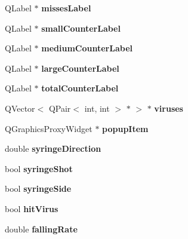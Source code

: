 \begin{DoxyCompactItemize}
\item 
\mbox{\label{classGameScene_aad6a61efba2e6f29f6fb65b8f7f7c609}} 
Q\+Label $\ast$ {\bfseries misses\+Label}
\item 
\mbox{\label{classGameScene_a729b30b1b93afceb74d91da40fe59089}} 
Q\+Label $\ast$ {\bfseries small\+Counter\+Label}
\item 
\mbox{\label{classGameScene_a13624da08c031f94ebd0fe64d312d7ff}} 
Q\+Label $\ast$ {\bfseries medium\+Counter\+Label}
\item 
\mbox{\label{classGameScene_a22d4e25913436a471671f6df7f2b31b0}} 
Q\+Label $\ast$ {\bfseries large\+Counter\+Label}
\item 
\mbox{\label{classGameScene_a11b39c8382f58ff70e211d1e266b9166}} 
Q\+Label $\ast$ {\bfseries total\+Counter\+Label}
\item 
\mbox{\label{classGameScene_aa6875246b95bb05f0a92c6c5fcd974e7}} 
Q\+Vector$<$ Q\+Pair$<$ int, int $>$ $\ast$ $>$ $\ast$ {\bfseries viruses}
\item 
\mbox{\label{classGameScene_a47243a49c11fc0f864bc89ecbb2266fd}} 
Q\+Graphics\+Proxy\+Widget $\ast$ {\bfseries popup\+Item}
\item 
\mbox{\label{classGameScene_af435d7691df3e0091cbcd4a642b5f401}} 
double {\bfseries syringe\+Direction}
\item 
\mbox{\label{classGameScene_aaaa4e9cfdf957c2e048fa8ebdafec7b8}} 
bool {\bfseries syringe\+Shot}
\item 
\mbox{\label{classGameScene_a6708bec5e51ca8ae55d4b3c4ab188565}} 
bool {\bfseries syringe\+Side}
\item 
\mbox{\label{classGameScene_a117065d5dfc251feec250f4c12034a28}} 
bool {\bfseries hit\+Virus}
\item 
\mbox{\label{classGameScene_a59f5fb906fe807f52f91d1eec178c982}} 
double {\bfseries falling\+Rate}

\end{DoxyCompactItemize}
